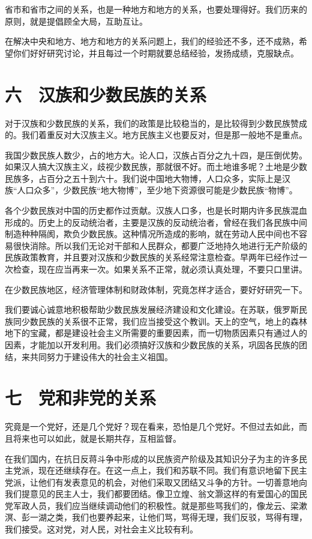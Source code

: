 省市和省市之间的关系，也是一种地方和地方的关系，也要处理得好。我们历来的原则，就是提倡顾全大局，互助互让。

在解决中央和地方、地方和地方的关系问题上，我们的经验还不多，还不成熟，希望你们好好研究讨论，并且每过一个时期就要总结经验，发扬成绩，克服缺点。

\section{六　汉族和少数民族的关系}

对于汉族和少数民族的关系，我们的政策是比较稳当的，是比较得到少数民族赞成的。我们着重反对大汉族主义。地方民族主义也要反对，但是那一般地不是重点。

我国少数民族人数少，占的地方大。论人口，汉族占百分之九十四，是压倒优势。如果汉人搞大汉族主义，歧视少数民族，那就很不好。而土地谁多呢？土地是少数民族多，占百分之五十到六十。我们说中国地大物博，人口众多，实际上是汉族“人口众多”，少数民族“地大物博”，至少地下资源很可能是少数民族“物博”。

各个少数民族对中国的历史都作过贡献。汉族人口多，也是长时期内许多民族混血形成的。历史上的反动统治者，主要是汉族的反动统治者，曾经在我们各民族中间制造种种隔阂，欺负少数民族。这种情况所造成的影响，就在劳动人民中间也不容易很快消除。所以我们无论对干部和人民群众，都要广泛地持久地进行无产阶级的民族政策教育，并且要对汉族和少数民族的关系经常注意检查。早两年已经作过一次检查，现在应当再来一次。如果关系不正常，就必须认真处理，不要只口里讲。

在少数民族地区，经济管理体制和财政体制，究竟怎样才适合，要好好研究一下。

我们要诚心诚意地积极帮助少数民族发展经济建设和文化建设。在苏联，俄罗斯民族同少数民族的关系很不正常，我们应当接受这个教训。天上的空气，地上的森林地下的宝藏，都是建设社会主义所需要的重要因素，而一切物质因素只有通过人的因素，才能加以开发利用。我们必须搞好汉族和少数民族的关系，巩固各民族的团结，来共同努力于建设伟大的社会主义祖国。

\section{七　党和非党的关系}

究竟是一个党好，还是几个党好？现在看来，恐怕是几个党好。不但过去如此，而且将来也可以如此，就是长期共存，互相监督。

在我们国内，在抗日反蒋斗争中形成的以民族资产阶级及其知识分子为主的许多民主党派，现在还继续存在。在这一点上，我们和苏联不同。我们有意识地留下民主党派，让他们有发表意见的机会，对他们采取又团结又斗争的方针。一切善意地向我们提意见的民主人士，我们都要团结。像卫立煌、翁文灏这样的有爱国心的国民党军政人员，我们应当继续调动他们的积极性。就是那些骂我们的，像龙云、梁漱溟、彭一湖之类，我们也要养起来，让他们骂，骂得无理，我们反驳，骂得有理，我们接受。这对党，对人民，对社会主义比较有利。

